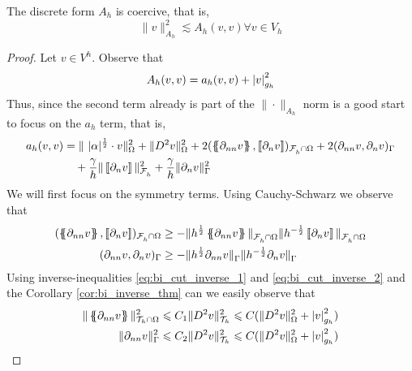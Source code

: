 \begin{lemma}
    \label{lemma:bi_Ah_coercive}
    The discrete form $A_{h}$ is coercive, that is, \[
    \| v \|_{ A_{h} }^{ 2 }  \lesssim A_{h}( v,v) \forall v \in V_{h}
    \]
\end{lemma}

\begin{proof}
    Let $v \in V^{h}$.
    Observe that \[
    A_{h}( v,v) = a_{h}( v,v)  + \left\lvert  v  \right\rvert_{g_{h}}^{2}
    \]
    Thus, since the second term already is part of the $\| \cdot  \|_{ A_{h} }^{  } $ norm is a good start to focus on the $a_{h}$ term, that is,
    \[
    \begin{split}
       a_{h}( v,v) &=   \|\ |\alpha|^{\frac{1}{2}} \cdot v  \|_{   \Omega   }^{2} + \| D^2v \|_{   \Omega  }^{2  } + 2 ( \mean{ \partial _{nn} v }, \jump{ \partial _{n} v }    )_{\mathcal{F} ^{}_{h} \cap \Omega }  + 2 (  \partial _{nn} v ,
       \partial _{n} v  )_{\Gamma } \\
                   & \quad+ \frac{\gamma }{h}  \|  \jump{ \partial _{n} v }\|_{\mathcal{F} _{h}^{}  }^{ 2 } + \frac{\gamma }{h}  \| \partial _{n} v \|_{ \Gamma  }^{ 2 }
    \end{split}
    \]
    We will first focus on the symmetry terms. Using Cauchy-Schwarz we observe that \[
        \begin{split}
    ( \mean{ \partial _{nn} v }  , \jump{ \partial _{n} v }  )_{\mathcal{F}^{}_{h}\cap \Omega  } & \ge - \| h^{\frac{1}{2}}\mean{ \partial _{nn} v }   \|_{ \mathcal{F}^{}_{h}\cap \Omega   }^{  }  \|h^{-\frac{1}{2}} \jump{ \partial _{n} v }   \|_{
    \mathcal{F}^{}_{h}\cap \Omega   }^{  } \\
    (  \partial _{nn} v   ,  \partial _{n} v   )_{\Gamma   } & \ge - \| h^{\frac{1}{2}} \partial _{nn} v    \|_{ \Gamma    }^{  }  \|h^{-\frac{1}{2}}  \partial _{n} v    \|_{ \Gamma    }^{  }
        \end{split}
    \]
    Using inverse-inequalities \eqref{eq:bi_cut_inverse_1} and \eqref{eq:bi_cut_inverse_2} and the Corollary \ref{cor:bi_inverse_thm} can we easily observe that \[
        \begin{split}
     \| \mean{ \partial _{nn}v } \|_{ \mathcal{T}_{h} \cap \Omega    }^{  2} & \le C_{1} \| D^2 v \|_{ \mathcal{T}_{h}   }^{2  } \le  C  (\| D^2 v \|_{ \Omega  }^{ 2 }  + \abs{ v } _{ g_{h} }^{2  } )  \\
     \|  \partial _{nn}v  \|_{ \Gamma     }^{ 2 } & \le C_{2} \| D^2 v \|_{ \mathcal{T} _{h}  }^{2  } \le C  (\| D^2 v \|_{ \Omega  }^{ 2 }  + \abs{ v } _{ g_{h} }^{2  } )

\end{split}\]
\end{proof}
